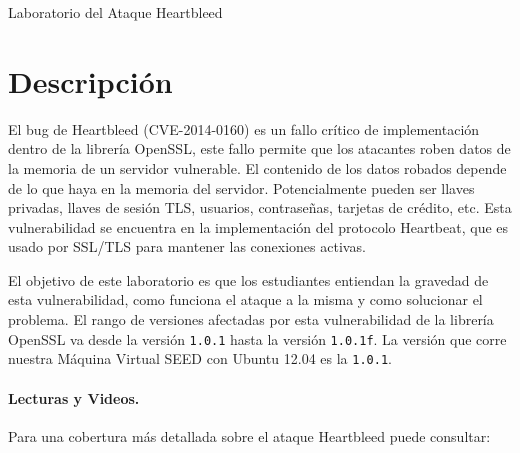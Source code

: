 
\newcommand{\commonfolder}{../../common-files}





\newcommand{\heartFigs}{./Figs}




\begin{center}
{\LARGE Laboratorio del Ataque Heartbleed}
\end{center}




\section{Descripción}

El bug de Heartbleed (CVE-2014-0160) es un fallo crítico de implementación dentro de la librería OpenSSL, este fallo permite que los atacantes roben datos de la memoria de un servidor vulnerable. El contenido de los datos robados depende de lo que haya en la memoria del servidor. Potencialmente pueden ser llaves privadas, llaves de sesión TLS, usuarios, contraseñas, tarjetas de crédito, etc. Esta vulnerabilidad se encuentra en la implementación del protocolo Heartbeat, que es usado por SSL/TLS para mantener las conexiones activas.

El objetivo de este laboratorio es que los estudiantes entiendan la gravedad de esta vulnerabilidad, como funciona el ataque a la misma y como solucionar el problema. El rango de versiones afectadas por esta vulnerabilidad de la librería OpenSSL va desde la versión {\tt 1.0.1} hasta la versión {\tt 1.0.1f}. La versión que corre nuestra Máquina Virtual SEED con Ubuntu 12.04 es la {\tt 1.0.1}. 


\paragraph{Lecturas y Videos.}
Para una cobertura más detallada sobre el ataque Heartbleed puede consultar:

